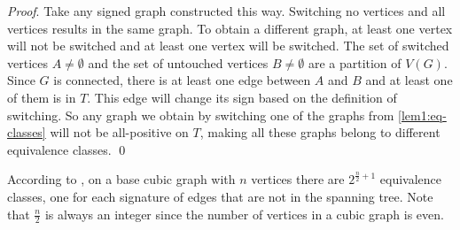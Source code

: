 \textit{Proof}. Take any signed graph constructed this way. Switching no vertices and all vertices results in the same graph. To obtain a different graph, at least one vertex will not be switched and at least one vertex will be switched. The set of switched vertices $A \neq \emptyset$ and the set of untouched vertices $B \neq \emptyset$ are a partition of $V(G)$. Since $G$ is connected, there is at least one edge between $A$ and $B$ and at least one of them is in $T$. This edge will change its sign based on the definition of switching. So any graph we obtain by switching one of the graphs from \cref{lem1:eq-classes} will not be all-positive on $T$, making all these graphs belong to different equivalence classes. \qed

According to , on a base cubic graph with $n$ vertices there are $2^{\frac{n}{2}+1}$ equivalence classes, one for each signature of edges that are not in the spanning tree. Note that $\frac{n}{2}$ is always an integer since the number of vertices in a cubic graph is even.
